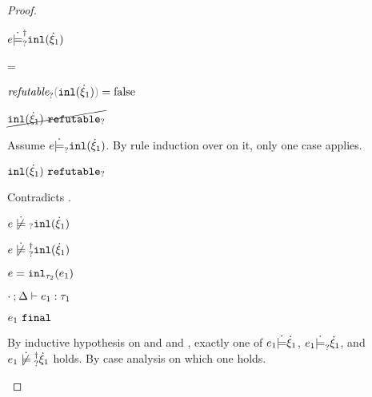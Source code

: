 \begin{proof}
\begin{byCases}
\begin{byCases}
\begin{byCases}
\begin{pfsteps*}
            \item $e \dot{\models}_{?}^{\dag} \mathtt{inl}(\dot{\xi}_1)$ 
            \end{pfsteps*}
        \item[\frefutable{\cinl{\hxi_1}}=\false]
            \begin{pfsteps*}
            \item $\frefutable{\cinl{\hxi_1}}=\false$  
            \item $\cancel{\mathtt{inl}(\dot{\xi}_1) ~\mathtt{refutable}_?}$  
            \end{pfsteps*}
            Assume $e \dot{\models}_{?} \mathtt{inl}(\dot{\xi}_1)$. By rule induction over  on it, only one case applies.
            \begin{byCases}
            \item[\text{(\ref{rule:CMSNotIntro})}]
                \begin{pfsteps*}
                \item $\mathtt{inl}(\dot{\xi}_1) ~\mathtt{refutable}_?$ 
                \end{pfsteps*}
                Contradicts .
            \end{byCases}
            \begin{pfsteps*}
            \item $\cnotmaysatisfy{e}{\cinl{\hxi_1}}$  
            \item $\cnotsatisfyormay{e}{\cinl{\hxi_1}}$ 
            \end{pfsteps*}
        \end{byCases}
    \item[\text{(\ref{rule:TInl})}]
        \begin{pfsteps*}
        \item $e=\mathtt{inl}_{\tau_2}({e_1})$ 
        \item $\cdot \mathbin{;} \Delta \vdash e_1 : \tau_1$  
        \item $e_1 ~\mathtt{final}$  
        \end{pfsteps*}
        By inductive hypothesis on  and  and , exactly one of $e_1 \dot{\models} \dot{\xi}_1$, $e_1 \dot{\models}_{?} \dot{\xi}_1$, and $\cnotsatisfyormay{e_1}{\hxi_1}$ holds. By case analysis on which one holds.

\end{byCases}
\end{byCases}
\end{proof}
